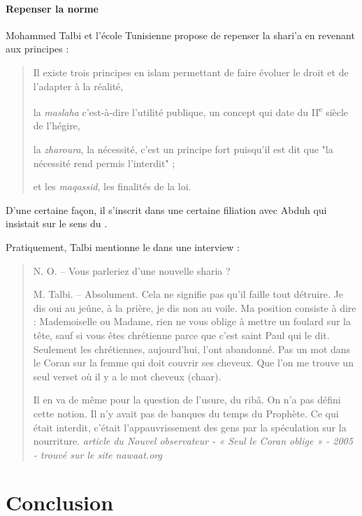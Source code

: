 \paragraph{Repenser la norme} Mohammed Talbi et l'école Tunisienne propose de repenser la shari'a en revenant aux principes :
\begin{quote}
    Il existe
trois principes en islam permettant de faire évoluer le droit et de
l'adapter
à la réalité, 

la \emph{maslaha} c'est-à-dire l'utilité publique, un
concept qui date du II\textsuperscript{e} siècle de l'hégire, 

la
\emph{zharoura}, la nécessité, c'est un principe fort puisqu'il est dit
que "la nécessité rend permis l'interdit" ; 

et les \emph{maqassid}, les
finalités de la loi. 
\end{quote}
D'une certaine façon, il s'inscrit dans une certaine filiation avec Abduh qui insistait sur le sens du \riba.

Pratiquement, Talbi mentionne le \riba dans une interview : 
\begin{quote}
  N. O. – Vous parleriez d’une nouvelle sharia ?

M. Talbi. – Absolument. Cela ne signifie pas qu’il faille tout détruire. Je dis oui au jeûne, à la prière, je dis non au voile. Ma position consiste à dire : Mademoiselle ou Madame, rien ne vous oblige à mettre un foulard sur la tête, sauf si vous êtes chrétienne parce que c’est saint Paul qui le dit. Seulement les chrétiennes, aujourd’hui, l’ont abandonné. Pas un mot dans le Coran sur la femme qui doit couvrir ses cheveux. Que l’on me trouve un seul verset où il y a le mot cheveux (chaar).

Il en va de même pour la question de l’usure, du ribâ. On n’a pas défini cette notion. Il n’y avait pas de banques du temps du Prophète. Ce qui était interdit, c’était l’appauvrissement des gens par la spéculation sur la nourriture. \textit{article du Nouvel observateur - « Seul le Coran oblige » - 2005 - trouvé sur le site \textit{nawaat.org} }  
\end{quote}
 
 

\section{Conclusion}


